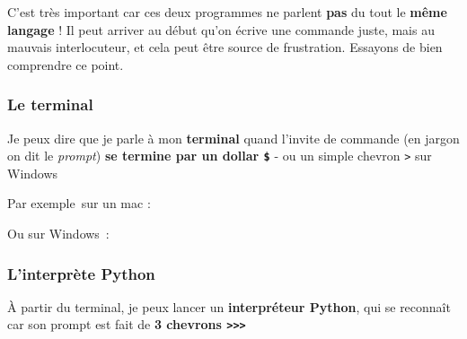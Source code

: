 C'est très important car ces deux programmes ne parlent \textbf{pas} du
tout le \textbf{même langage} ! Il peut arriver au début qu'on écrive
une commande juste, mais au mauvais interlocuteur, et cela peut être
source de frustration. Essayons de bien comprendre ce point.

    \hypertarget{le-terminal}{%
\subsubsection{Le terminal}\label{le-terminal}}

Je peux dire que je parle à mon \textbf{terminal} quand l'invite de
commande (en jargon on dit le \emph{prompt}) \textbf{se termine par un
dollar \texttt{\$}} - ou un simple chevron \texttt{\textgreater{}} sur
Windows

Par exemple~sur un mac :

\begin{Shaded}
\begin{Highlighting}[frame=lines,framerule=0.6mm,rulecolor=\color{asisframecolor}]
\NormalTok{ $ }
\end{Highlighting}
\end{Shaded}

Ou sur Windows~:

\begin{Shaded}
\begin{Highlighting}[frame=lines,framerule=0.6mm,rulecolor=\color{asisframecolor}]
\OperatorTok{>}
\end{Highlighting}
\end{Shaded}

    \hypertarget{linterpruxe8te-python}{%
\subsubsection{L'interprète Python}\label{linterpruxe8te-python}}

À partir du terminal, je peux lancer un \textbf{interpréteur Python},
qui se reconnaît car son prompt est fait de \textbf{3 chevrons
\texttt{\textgreater{}\textgreater{}\textgreater{}}}

\begin{Shaded}
\begin{Highlighting}[frame=lines,framerule=0.6mm,rulecolor=\color{asisframecolor}]
\NormalTok{[}\NormalTok{ 9.0.0 (clang-900.0.39.2)] }
 \NormalTok{, }\NormalTok{, }
\OperatorTok{>>>}
\end{Highlighting}
\end{Shaded}

